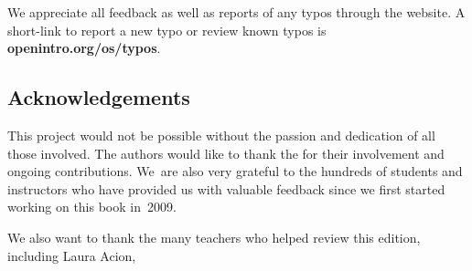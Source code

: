 We appreciate all feedback as well as reports of any
typos through the website.
A short-link to report a new typo or review known typos is
    {\color{black}\textbf{openintro.org/os/typos}}.



\subsection*{Acknowledgements}

This project would not be possible without the passion
and dedication of all those involved.
The authors would like to thank the
for their involvement and ongoing contributions.
We~are also very grateful to the hundreds of students
and instructors who have provided us with valuable feedback
since we first started working on this book in~2009.

We also want to thank the many teachers who helped review
this edition, including
Laura Acion,

